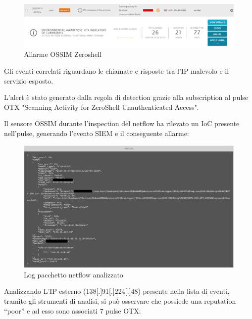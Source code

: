 \begin{figure}[h]
    \begin{center}
        \includegraphics[width=0.98\columnwidth]{images/4_caso_d'uso_img/zeroshellevents.png}
    \end{center}
    \caption{Allarme OSSIM Zeroshell}
    \label{fig:Allarme OSSIM Zeroshell}
\end{figure} 

Gli eventi correlati riguardano le chiamate e risposte tra l’IP malevolo e il servizio esposto.\par
L’alert è stato generato dalla regola di detection grazie alla subscription al pulse OTX "Scanning Activity for ZeroShell Unauthenticated Access".\par
Il sensore OSSIM durante l’inspection del netflow ha rilevato un IoC presente nell’pulse, generando l’evento SIEM e il conseguente allarme: 

\begin{figure}[h]
    \begin{center}
        \includegraphics[width=0.98\columnwidth]{images/4_caso_d'uso_img/inspectionOSSIM.png}
    \end{center}
    \caption{Log pacchetto netflow analizzato}
    \label{fig:Log pacchetto netflow analizzato}
\end{figure} 

Analizzando L’IP esterno (138[.]91[.]224[.]48) presente nella lista di eventi, tramite gli strumenti di analisi, si può osservare che possiede una reputation “poor” e ad esso sono associati 7 pulse OTX:

